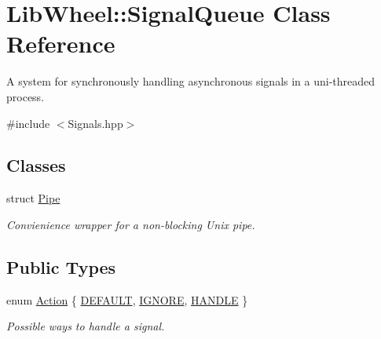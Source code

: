 \hypertarget{classLibWheel_1_1SignalQueue}{
\section{\-Lib\-Wheel\-:\-:\-Signal\-Queue \-Class \-Reference}
\label{classLibWheel_1_1SignalQueue}
}


\-A system for synchronously handling asynchronous signals in a uni-\/threaded process.  




{\ttfamily \#include $<$\-Signals.\-hpp$>$}

\subsection*{\-Classes}
\begin{DoxyCompactItemize}
\item 
struct \hyperlink{structLibWheel_1_1SignalQueue_1_1Pipe}{\-Pipe}
\begin{DoxyCompactList}\small\item\em \-Convienience wrapper for a non-\/blocking \-Unix pipe. \end{DoxyCompactList}\end{DoxyCompactItemize}
\subsection*{\-Public \-Types}
\begin{DoxyCompactItemize}
\item 
enum \hyperlink{classLibWheel_1_1SignalQueue_a5a366bd8de3564c5e3001233464d20e3}{\-Action} \{ \hyperlink{classLibWheel_1_1SignalQueue_a5a366bd8de3564c5e3001233464d20e3a999854ec907bcd96c6948c5fab16337a}{\-D\-E\-F\-A\-U\-L\-T}, 
\hyperlink{classLibWheel_1_1SignalQueue_a5a366bd8de3564c5e3001233464d20e3a57f9c96915e2cbabc7c7ea653a43bc83}{\-I\-G\-N\-O\-R\-E}, 
\hyperlink{classLibWheel_1_1SignalQueue_a5a366bd8de3564c5e3001233464d20e3a4ee98693cfe0961ea7dcfac5f2053174}{\-H\-A\-N\-D\-L\-E}
 \}
\begin{DoxyCompactList}\small\item\em \-Possible ways to handle a signal. \end{DoxyCompactList}\end{DoxyCompactItemize}
